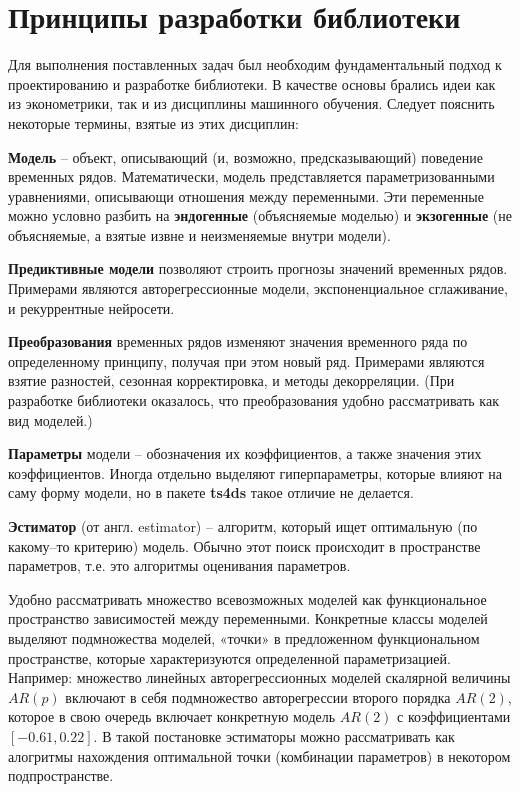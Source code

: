 \documentclass[../report.tex]{subfiles}
\begin{document}
	\section{Принципы разработки библиотеки}
	
	Для выполнения поставленных задач был необходим фундаментальный подход к проектированию и разработке библиотеки. В качестве основы брались идеи как из эконометрики, так и из дисциплины машинного обучения. Следует пояснить некоторые термины, взятые из этих дисциплин:
	
	\textbf{Модель} – объект, описывающий (и, возможно, предсказывающий) поведение временных рядов. Математически, модель представляется параметризованными уравнениями, описывающи отношения между переменными. Эти переменные можно условно разбить на \textbf{эндогенные} (объясняемые моделью) и \textbf{экзогенные} (не объясняемые, а взятые извне и неизменяемые внутри модели).
	
	\textbf{Предиктивные модели} позволяют строить прогнозы значений временных рядов. Примерами являются авторегрессионные модели, экспоненциальное сглаживание, и рекуррентные нейросети.
	
	\textbf{Преобразования} временных рядов изменяют значения временного ряда по определенному принципу, получая при этом новый ряд. Примерами являются взятие разностей, сезонная корректировка, и методы декорреляции. (При разработке библиотеки оказалось, что преобразования удобно рассматривать как вид моделей.)
	
	\textbf{Параметры} модели – обозначения их коэффициентов, а также значения этих коэффициентов. Иногда отдельно выделяют гиперпараметры, которые влияют на саму форму модели, но в пакете \textbf{ts4ds} такое отличие не делается.
	
	\textbf{Эстиматор} (от англ. estimator) – алгоритм, который ищет оптимальную (по какому–то критерию) модель. Обычно этот поиск происходит в пространстве параметров, т.е. это алгоритмы оценивания параметров.
	
	Удобно рассматривать множество всевозможных моделей как функциональное пространство зависимостей между переменными. Конкретные классы моделей выделяют подмножества моделей, «точки» в предложенном функциональном пространстве, которые характеризуются определенной параметризацией. Например: множество линейных авторегрессионных моделей скалярной величины $AR(p)$ включают в себя подмножество авторегрессии второго порядка $AR(2)$, которое в свою очередь включает конкретную модель $AR(2)$ с коэффициентами $[-0.61, 0.22]$. В такой постановке эстиматоры можно рассматривать как алогритмы нахождения оптимальной точки (комбинации параметров) в некотором подпространстве.
	
\end{document}
